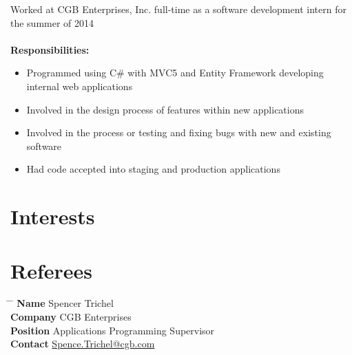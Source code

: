 \documentclass[10pt]{article} %
\begin{document}
Worked at CGB Enterprises, Inc. full-time as a software development intern for the summer of 2014 \\ \\
\textbf{Responsibilities:}
\begin{itemize}
\item Programmed using C\# with MVC5 and Entity Framework developing internal web applications
\item Involved in the design process of features within new applications
\item Involved in the process or testing and fixing bugs with new and existing software
\item Had code accepted into staging and production applications
\end{itemize}


\section{Interests}



\section{Referees}

\parbox{0.5\textwidth}{ %
\begin{tabbing}
\hspace{2.75cm} \= \hspace{4cm} \= \kill %
{\bf Name} \> Spencer Trichel \\ %
{\bf Company} \> CGB Enterprises \\ %
{\bf Position} \> Applications Programming Supervisor \\ %
{\bf Contact} \> \href{mailto:Spence.Trichel@cgb.com}{Spence.Trichel@cgb.com} %
\end{tabbing}}

\end{document}
